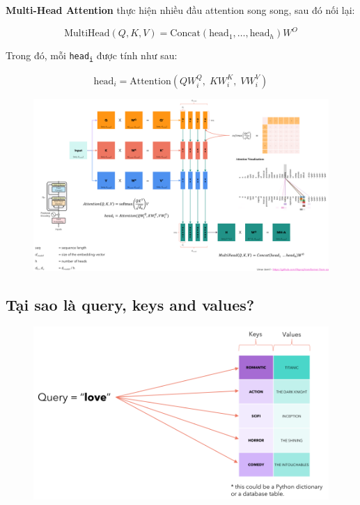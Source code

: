 \documentclass{book}
\begin{document}
            \textbf{Multi-Head Attention} thực hiện nhiều đầu attention song song, sau đó nối lại:
            
            \[
            \text{MultiHead}(Q, K, V) = \text{Concat}(\text{head}_1, \ldots, \text{head}_h) W^O
            \]
            
            Trong đó, mỗi \texttt{head\textsubscript{i}} được tính như sau:
            
            \[
            \text{head}_i = \text{Attention}(Q W_i^Q,\; K W_i^K,\; V W_i^V)
            \]
            \begin{figure}[H]
                \centering
                \includegraphics[width=1.0  \linewidth]{images/12d_13.png}
        
            \end{figure}
            \subsection*{Tại sao là query, keys and values?}
            \begin{figure}[H]
                    \centering
                    \includegraphics[width=0.8  \linewidth]{images/12d_14.png}
            
            \end{figure}
\end{document}
